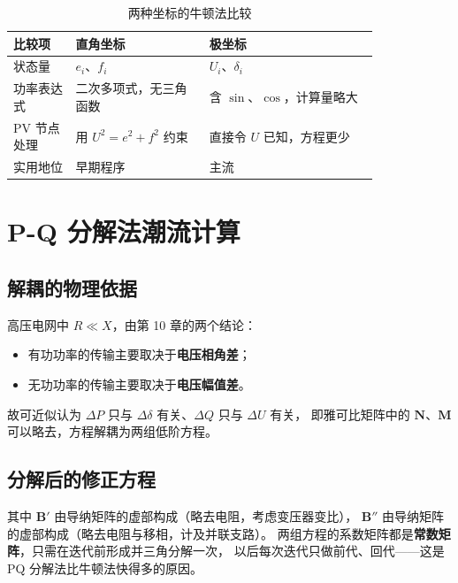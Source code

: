 \begin{table}[htbp]
  \centering
  \caption{两种坐标的牛顿法比较}
  \small
  \begin{tabular}{@{}p{0.14\linewidth}p{0.30\linewidth}p{0.38\linewidth}@{}}
    \toprule
    比较项 & 直角坐标 & 极坐标 \\
    \midrule
    状态量 & $e_i$、$f_i$ & $U_i$、$\delta_i$ \\
    功率表达式 & 二次多项式，无三角函数 & 含 $\sin$、$\cos$，计算量略大 \\
    PV 节点处理 & 用 $U^{2}=e^{2}+f^{2}$ 约束 & 直接令 $U$ 已知，方程更少 \\
    实用地位 & 早期程序 & 主流 \\
    \bottomrule
  \end{tabular}
\end{table}

\section{P-Q 分解法潮流计算}

\subsection{解耦的物理依据}

高压电网中 $R\ll X$，由第 10 章的两个结论：
\begin{itemize}
  \item 有功功率的传输主要取决于\textbf{电压相角差}；
  \item 无功功率的传输主要取决于\textbf{电压幅值差}。
\end{itemize}
故可近似认为 $\Delta P$ 只与 $\Delta\delta$ 有关、$\Delta Q$ 只与 $\Delta U$ 有关，
即雅可比矩阵中的 $\boldsymbol N$、$\boldsymbol M$ 可以略去，方程解耦为两组低阶方程。

\subsection{分解后的修正方程}

其中 $\boldsymbol B'$ 由导纳矩阵的虚部构成（略去电阻，考虑变压器变比），
$\boldsymbol B''$ 由导纳矩阵的虚部构成（略去电阻与移相，计及并联支路）。
两组方程的系数矩阵都是\textbf{常数矩阵}，只需在迭代前形成并三角分解一次，
以后每次迭代只做前代、回代——这是 PQ 分解法比牛顿法快得多的原因。

